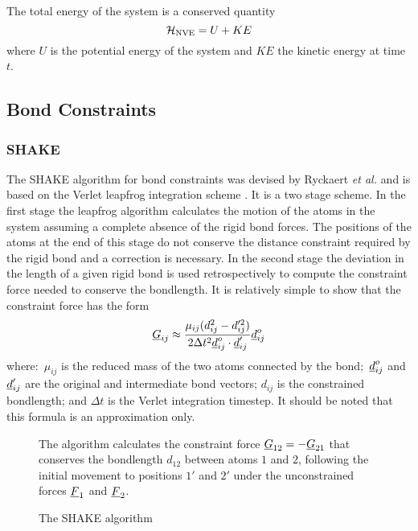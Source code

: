 The total energy of the system is a conserved quantity
\begin{equation}
{\cal H}_{\rm NVE} = U + KE
\end{equation}
where $U$ is the potential energy of the system and $KE$ the kinetic energy at time $t$.

\subsection{Bond Constraints}

\subsubsection{SHAKE}
\label{shake}

The SHAKE algorithm for bond constraints was devised by Ryckaert {\em
et al.} \cite{ryckaert-77a} and is based on the Verlet leapfrog
 integration scheme
\cite{allen-89a}. It is a two stage scheme. In the first stage the
leapfrog algorithm calculates the motion of the atoms in the system
assuming a complete absence of the rigid bond forces. The positions of the atoms at the
end of this stage do not conserve the distance constraint required by
the rigid bond and a correction is necessary.  In
the second stage the deviation in the length of a given rigid
bond is used retrospectively to compute the
constraint force needed to conserve the bondlength.  It is relatively
simple to show that the constraint force has the form
\begin{equation}
\mbox{$\underline{G}$}_{ij}\approx\frac{\mu_{ij}(d_{ij}^{2}-d_{ij}'^{2})}
{2\Delta t^{2}\mbox{$\underline{d}$}_{ij}^{o}\cdot\mbox{$\underline{d}$}_{ij}'}\mbox{$\underline{d}$}_{ij}^{o} \label{g12}
\end{equation}
where:~$\mu_{ij}$ is the reduced mass of the two atoms connected by
the bond;~$\mbox{$\underline{d}$}_{ij}^{o}$ and $\mbox{$\underline{d}$}_{ij}'$ are the original and
intermediate bond vectors; $d_{ij}$ is the constrained bondlength; and
$\Delta t$ is the Verlet integration timestep. It should be noted
that this formula is an approximation only.

\begin{figure}[ht]
\begin{center}
\centerline{}
\caption{The SHAKE algorithm}
\end{center}
The algorithm calculates the constraint force
$\mbox{$\underline{G}$}_{12}=-\mbox{$\underline{G}$}_{21}$ that conserves the bondlength $d_{12}$
between atoms $1$ and $2$, following the initial movement to positions
$1'$ and $2'$ under the unconstrained forces $\mbox{$\underline{F}$}_{1}$ and $\mbox{$\underline{F}$}_{2}$.
\end{figure}

